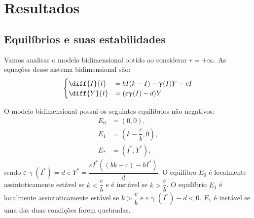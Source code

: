\documentclass{article}
\begin{document}
\section{Resultados}
\subsection{Equilíbrios e suas estabilidades}
Vamos analisar o modelo bidimensional obtido ao considerar $r = + \infty$. As equações desse sistema bidimensional são:
\begin{equation}\label{eq:sist_bi}
\begin{split}
    \begin{cases}
    \diff{I}{t} & = bI(k - I) - \upgamma(I)Y - cI \\
    \diff{Y}{t} & = (\varepsilon \upgamma(I) - d)Y
    \end{cases}
\end{split}
\end{equation}

O modelo bidimensional possui os seguintes equilíbrios não negativos:
\begin{equation*}
\begin{split}
    E_0 & = (0,0), \\
    E_1 & = \left( k - \dfrac{c}{b}, 0 \right), \\
    E_* & = (I^*, Y^*),
\end{split}
\end{equation*}
sendo $\varepsilon \upgamma(I^*) = d$ e $Y^* = \dfrac{\varepsilon I^* ((bk - c) - bI^*)}{d}$. O equilibro $E_0$ é localmente assintoticamente estável se $k < \dfrac{c}{b}$ e é instável se $k > \dfrac{c}{b}$. O equilíbrio $E_1$ é localmente assintoticamente estável se $k > \dfrac{c}{b}$ e $\varepsilon \upgamma(I^*) - d < 0$. $E_1$ é instável se uma das duas condições forem quebradas.
\end{document}
